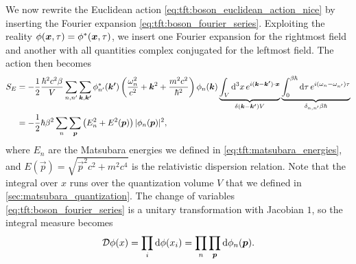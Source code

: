 We now rewrite the Euclidean action \eqref{eq:tft:boson_euclidean_action_nice} by inserting the Fourier expansion \eqref{eq:tft:boson_fourier_series}.
Exploiting the reality $\phi({\bm{x}}, \tau) = {\phi}^*({\bm{x}}, \tau)$, we insert one Fourier expansion for the rightmost field and another with all quantities complex conjugated for the leftmost field.
The action then becomes
\begin{equation}
\begin{split}
	S_E & = -\frac12 \frac{\hbar^2 c^2 \beta}{V}
	        \sum_{n,n'} \sum_{{\bm{k}},{\bm{k'}}} 
	    	  {\phi}^*_{n'}({\bm{k'}}) 
	    	  \left( \frac{\omega_n^2}{c^2} + {\bm{k}}^2 + \frac{m^2 c^2}{\hbar^2} \right)
	  	  \phi_{n}({\bm{k}})
	  	  \underbrace{\int_V \mathop{}\!\mathrm{d}^3 x \, e^{i ({\bm{k}} - {\bm{k'}}) \cdot {\bm{x}}}}_{\delta({\bm{k}}-{\bm{k'}}) V}
	      \underbrace{\int_0^{\beta \hbar} \mathop{}\!\mathrm{d} \tau \, e^{i (\omega_n - \omega_{n'}) \tau}}_{\delta_{n,n'} \beta \hbar}
	  	  \\
	    & = -\frac12 \hbar \beta^2
	        \sum_n \sum_{\bm{p}}
	  	    \left( E_n^2 + E^2({\bm{p}}) \right)
		    \lvert \phi_{n}({\bm{p}}) \rvert^2 ,
\end{split}
\label{eq:tft:boson_action_fourier}
\end{equation}
where $E_n$ are the Matsubara energies we defined in \cref{eq:tft:matsubara_energies}, and $E(\vec{p}) = \sqrt{\vec{p}^2 c^2 + m^2 c^4}$ is the relativistic dispersion relation.
Note that the integral over $x$ runs over the quantization volume $V$ that we defined in \cref{sec:matsubara_quantization}.
The change of variables \eqref{eq:tft:boson_fourier_series} is a unitary transformation with Jacobian $1$, so the integral measure becomes
\begin{equation}
	\mathcal{D} \phi(x) =
	\prod_i \mathop{}\!\mathrm{d} \phi(x_i) =
	\prod_n \prod_{\bm{p}} \mathop{}\!\mathrm{d} \phi_n({\bm{p}}) .
\label{eq:tft:boson_integral_new_variables}
\end{equation}


